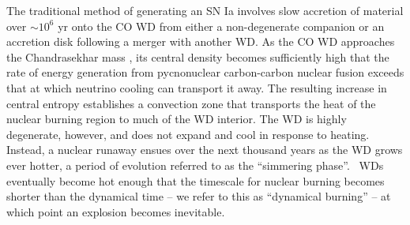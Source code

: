 The traditional method of generating an SN Ia involves slow accretion of material over $\sim10^6$ yr onto the CO WD from either a non-degenerate companion or an accretion disk following a merger with another WD.  As the CO WD approaches the Chandrasekhar mass \Mch, its central density becomes sufficiently high that the rate of energy generation from pycnonuclear carbon-carbon nuclear fusion exceeds that at which neutrino cooling can transport it away.  The resulting increase in central entropy establishes a convection zone that transports the heat of the nuclear burning region to much of the WD interior.  The WD is highly degenerate, however, and does not expand and cool in response to heating.  Instead, a nuclear runaway ensues over the next thousand years as the WD grows ever hotter, a period of evolution referred to as the ``simmering phase''.  \Mch\ WDs eventually become hot enough that the timescale for nuclear burning becomes shorter than the dynamical time -- we refer to this as ``dynamical burning'' -- at which point an explosion becomes inevitable.



